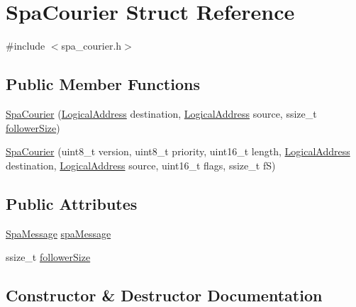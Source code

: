 \hypertarget{structSpaCourier}{}\section{Spa\+Courier Struct Reference}
\label{structSpaCourier}


{\ttfamily \#include $<$spa\+\_\+courier.\+h$>$}

\subsection*{Public Member Functions}
\begin{DoxyCompactItemize}
\item 
\hyperlink{structSpaCourier_a79c58c501a8b0f5dbde22e7d3f526db2}{Spa\+Courier} (\hyperlink{structLogicalAddress}{Logical\+Address} destination, \hyperlink{structLogicalAddress}{Logical\+Address} source, ssize\+\_\+t \hyperlink{structSpaCourier_a0a96d2328c68554838cc1e736181dfd1}{follower\+Size})
\item 
\hyperlink{structSpaCourier_ac773f210ab350c0e8557c67cbc1b3971}{Spa\+Courier} (uint8\+\_\+t version, uint8\+\_\+t priority, uint16\+\_\+t length, \hyperlink{structLogicalAddress}{Logical\+Address} destination, \hyperlink{structLogicalAddress}{Logical\+Address} source, uint16\+\_\+t flags, ssize\+\_\+t fS)
\end{DoxyCompactItemize}
\subsection*{Public Attributes}
\begin{DoxyCompactItemize}
\item 
\hyperlink{structSpaMessage}{Spa\+Message} \hyperlink{structSpaCourier_a6121a451925b18b20a5ee30669fcf46c}{spa\+Message}
\item 
ssize\+\_\+t \hyperlink{structSpaCourier_a0a96d2328c68554838cc1e736181dfd1}{follower\+Size}
\end{DoxyCompactItemize}


\subsection{Constructor \& Destructor Documentation}
\mbox{\label{structSpaCourier_a79c58c501a8b0f5dbde22e7d3f526db2}} 
